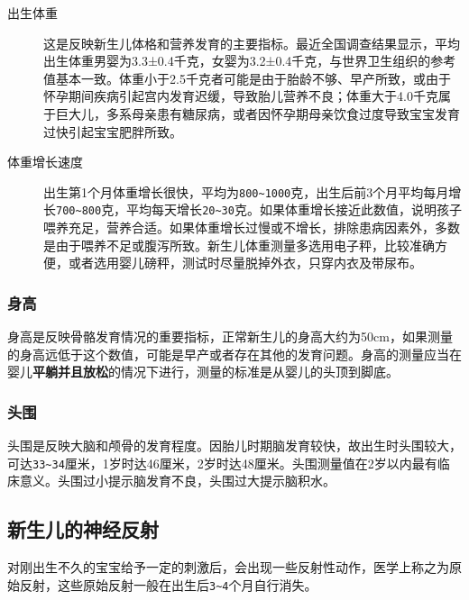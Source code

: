 \begin{description}
\item[出生体重] 这是反映新生儿体格和营养发育的主要指标。最近全国调查结果显示，平均出生体重男婴为3.3±0.4千克，女婴为3.2±0.4千克，与世界卫生组织的参考值基本一致。体重小于2.5千克者可能是由于胎龄不够、早产所致，或由于怀孕期间疾病引起宫内发育迟缓，导致胎儿营养不良；体重大于4.0千克属于巨大儿，多系母亲患有糖尿病，或者因怀孕期母亲饮食过度导致宝宝发育过快引起宝宝肥胖所致。

\item[体重增长速度] 出生第1个月体重增长很快，平均为\texttt{800\textasciitilde{}1000}\hspace{0pt}克，出生后前3个月平均每月增长\texttt{700\textasciitilde{}800}\hspace{0pt}克，平均每天增长\texttt{20\textasciitilde{}30}\hspace{0pt}克。如果体重增长接近此数值，说明孩子喂养充足，营养合适。如果体重增长过慢或不增长，排除患病因素外，多数是由于喂养不足或腹泻所致。新生儿体重测量多选用电子秤，比较准确方便，或者选用婴儿磅秤，测试时尽量脱掉外衣，只穿内衣及带尿布。
\end{description}

\subsubsection{身高}%

身高是反映骨骼发育情况的重要指标，正常新生儿的身高大约为50cm，如果测量的身高远低于这个数值，可能是早产或者存在其他的发育问题。身高的测量应当在婴儿\textbf{平躺并且放松}的情况下进行，测量的标准是从婴儿的头顶到脚底。

\subsubsection{头围}

头围是反映大脑和颅骨的发育程度。因胎儿时期脑发育较快，故出生时头围较大，可达\texttt{33\textasciitilde{}34}\hspace{0pt}厘米，1岁时达46厘米，2岁时达48厘米。头围测量值在2岁以内最有临床意义。头围过小提示脑发育不良，头围过大提示脑积水。

\subsection{新生儿的神经反射}

对刚出生不久的宝宝给予一定的刺激后，会出现一些反射性动作，医学上称之为原始反射，这些原始反射一般在出生后\texttt{3\textasciitilde{}4}\hspace{0pt}个月自行消失。

